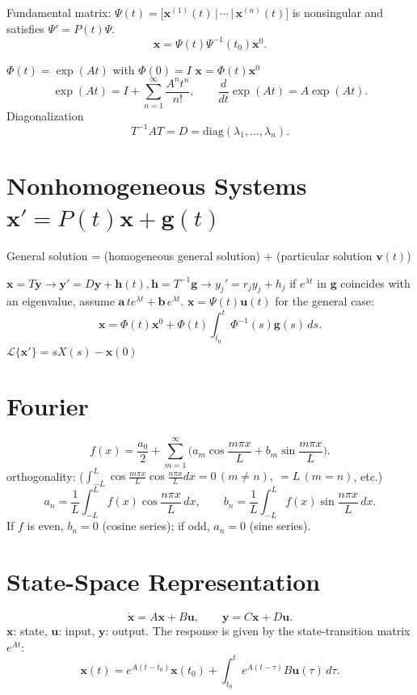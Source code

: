 \documentclass[10pt]{article}
\begin{document}
Fundamental matrix: $\Psi(t)=\big[\mathbf{x}^{(1)}(t)\,|\,\cdots\,|\,\mathbf{x}^{(n)}(t)\big]$ is nonsingular and satisfies $\Psi'=P(t)\Psi$.
\[
\mathbf{x}=\Psi(t)\Psi^{-1}(t_0)\mathbf{x}^0.
\]

$\Phi(t)=\exp(At)$ with $\Phi(0)=I$
$\mathbf{x}=\Phi(t)\mathbf{x}^0$
\[
\exp(At)=I+\sum_{n=1}^{\infty}\frac{A^n t^n}{n!},\qquad
\frac{d}{dt}\exp(At)=A\exp(At).
\]
Diagonalization
\[
T^{-1}AT=D=\mathrm{diag}(\lambda_1,\dots,\lambda_n).
\]

\section{Nonhomogeneous Systems $\mathbf{x}'=P(t)\mathbf{x}+\mathbf{g}(t)$}

General solution = (homogeneous general solution) + (particular solution $\mathbf{v}(t)$)

$\mathbf{x}=T\mathbf{y} \to \mathbf{y}'=D\mathbf{y}+\mathbf{h}(t), \mathbf{h}=T^{-1}\mathbf{g} \to y_j'=r_j y_j+h_j$
if $e^{\lambda t}$ in $\mathbf{g}$ coincides with an eigenvalue, assume $\mathbf{a}\,t e^{\lambda t}+\mathbf{b}\,e^{\lambda t}$.
$\mathbf{x}=\Psi(t)\mathbf{u}(t)$ for the general case:
\[
\mathbf{x}=\Phi(t)\mathbf{x}^0+\Phi(t)\!\int_{t_0}^{t}\!\Phi^{-1}(s)\mathbf{g}(s)\,ds.
\]
$\mathcal{L}\{\mathbf{x}'\}=sX(s)-\mathbf{x}(0)$

\section{Fourier}

\[
f(x)=\frac{a_0}{2}+\sum_{m=1}^{\infty}\Big(a_m\cos\frac{m\pi x}{L}+b_m\sin\frac{m\pi x}{L}\Big).
\]
orthogonality: ($\int_{-L}^{L}\cos\frac{m\pi x}{L}\cos\frac{n\pi x}{L}dx=0\,(m\neq n),\ =L\,(m=n)$, etc.)
\[
a_n=\frac{1}{L}\!\int_{-L}^{L}\! f(x)\cos\frac{n\pi x}{L}\,dx,\qquad
b_n=\frac{1}{L}\!\int_{-L}^{L}\! f(x)\sin\frac{n\pi x}{L}\,dx.
\]
If $f$ is even, $b_n=0$ (cosine series); if odd, $a_n=0$ (sine series).

\clearpage

\section{State-Space Representation}
\[
\dot{\mathbf{x}}=A\mathbf{x}+B\mathbf{u},\qquad \mathbf{y}=C\mathbf{x}+D\mathbf{u}.
\]
$\mathbf{x}$: state, $\mathbf{u}$: input, $\mathbf{y}$: output. 
The response is given by the state-transition matrix $e^{At}$:
\[
\mathbf{x}(t)=e^{A(t-t_0)}\mathbf{x}(t_0)+\int_{t_0}^{t}e^{A(t-\tau)}B\mathbf{u}(\tau)\,d\tau.
\]
\end{document}
